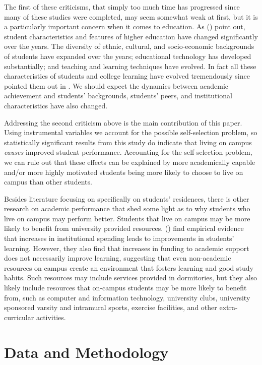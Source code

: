 \documentclass[12pt]{article}
\newcommand{\citee}[1]{\citename{#1} (\citeyear{#1})}
\begin{document}
The first of these criticisms, that simply too much time has progressed since many of these studies were completed, may seem somewhat weak at first, but it is a particularly important concern when it comes to education. As \citee{pt1991} point out, student characteristics and features of higher education have changed significantly over the years. The diversity of ethnic, cultural, and socio-economic backgrounds of students have expanded over the years; educational technology has developed substantially; and teaching and learning techniques have evolved. In fact all these characteristics of students and college learning have evolved tremendously since  pointed them out in \citeyear{pt1991}.  We should expect the dynamics between academic achievement and students' backgrounds, students' peers, and institutional characteristics have also changed.

Addressing the second criticism above is the main contribution of this paper. Using instrumental variables we account for the possible self-selection problem, so statistically significant results from this study do indicate that living on campus \textit{causes} improved student performance.  Accounting for the self-selection problem, we can rule out that these effects can be explained by more academically capable and/or more highly motivated students being more likely to choose to live on campus than other students.

Besides literature focusing on specifically on students' residences, there is other research on academic performance that shed some light as to why students who live on campus may perform better. Students that live on campus may be more likely to benefit from university provided resources. \citee{ts2001} find empirical evidence that increases in institutional spending leads to improvements in students' learning. However, they also find that increases in funding to academic support does not necessarily improve learning, suggesting that even non-academic resources on campus create an environment that fosters learning and good study habits. Such resources may include services provided in dormitories, but they also likely include resources that on-campus students may be more likely to benefit from, such as computer and information technology, university clubs, university sponsored varsity and intramural sports, exercise facilities, and other extra-curricular activities. 

\section{Data and Methodology}
\end{document}
